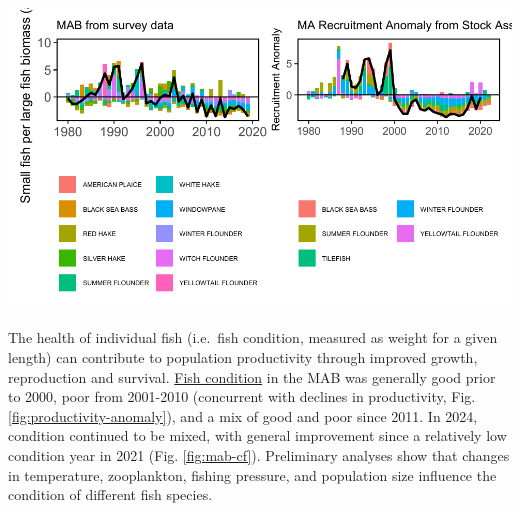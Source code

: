 \documentclass[
  10pt,
]{article}
\let\origfigure\figure
\let\endorigfigure\endfigure
\renewenvironment{figure}[1][2] {
    \expandafter\origfigure\expandafter[H]
} {
    \endorigfigure
}
\begin{document}
\begin{figure}

{\centering \includegraphics{midatlantic_files/figure-latex/productivity-anomaly-1} 

}

\caption{Fish productivity measures. Left: Small fish per large fish survey biomass anomaly in the Mid-Atlantic Bight. Right: assessment recruitment per spawning stock biomass anomaly for stocks mainly in the Mid-Atlantic. The summed anomaly across species is shown by the black line, drawn across all years with the same number of stocks analyzed.}\label{fig:productivity-anomaly}
\end{figure}

The health of individual fish (i.e.~fish condition, measured as weight for a given length) can contribute to population productivity through improved growth, reproduction and survival. \href{https://noaa-edab.github.io/catalog/condition.html}{Fish condition} in the MAB was generally good prior to 2000, poor from 2001-2010 (concurrent with declines in productivity, Fig. \ref{fig:productivity-anomaly}), and a mix of good and poor since 2011. In 2024, condition continued to be mixed, with general improvement since a relatively low condition year in 2021 (Fig. \ref{fig:mab-cf}). Preliminary analyses show that changes in temperature, zooplankton, fishing pressure, and population size influence the condition of different fish species.
\end{document}
